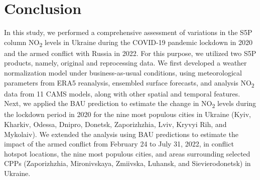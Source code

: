 \section{Conclusion} \label{chap3_conclusion}
In this study, we performed a comprehensive assessment of variations in the S5P column NO\textsubscript{2} levels in Ukraine during the COVID-19 pandemic lockdown in 2020 and the armed conflict with Russia in 2022. For this purpose, we utilized two S5P products, namely, original and reprocessing data. We first developed a weather normalization model under business-as-usual conditions, using meteorological parameters from ERA5 reanalysis, ensembled surface forecasts, and analysis NO\textsubscript{2} data from 11 CAMS models, along with other spatial and temporal features. Next, we applied the BAU prediction to estimate the change in NO\textsubscript{2} levels during the lockdown period in 2020 for the nine most populous cities in Ukraine (Kyiv, Kharkiv, Odessa, Dnipro, Donetsk, Zaporizhzhia, Lviv, Kryvyi Rih, and Mykolaiv). We extended the analysis using BAU predictions to estimate the impact of the armed conflict from February 24 to July 31, 2022, in conflict hotspot locations, the nine most populous cities, and areas surrounding selected CPPs (Zaporizhzhia, Mironivskaya, Zmiivska, Luhansk, and Sievierodonetsk) in Ukraine.\par

